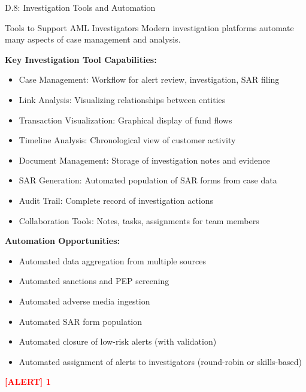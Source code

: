 \documentclass[11pt,a4paper]{beamer}
\newcommand{\redflag}[1]{\textcolor{red}{\textbf{[ALERT] 1}}}
\begin{document}
\begin{frame}{D.8: Investigation Tools and Automation}
	\begin{block}{Tools to Support AML Investigators}
		Modern investigation platforms automate many aspects of case management and analysis.
	\end{block}
	\textbf{Key Investigation Tool Capabilities:}
	\begin{itemize}
		\item Case Management: Workflow for alert review, investigation, SAR filing
		\item Link Analysis: Visualizing relationships between entities
		\item Transaction Visualization: Graphical display of fund flows
		\item Timeline Analysis: Chronological view of customer activity
		\item Document Management: Storage of investigation notes and evidence
		\item SAR Generation: Automated population of SAR forms from case data
		\item Audit Trail: Complete record of investigation actions
		\item Collaboration Tools: Notes, tasks, assignments for team members
	\end{itemize}
	\textbf{Automation Opportunities:}
	\begin{itemize}
		\item Automated data aggregation from multiple sources
		\item Automated sanctions and PEP screening
		\item Automated adverse media ingestion
		\item Automated SAR form population
		\item Automated closure of low-risk alerts (with validation)
		\item Automated assignment of alerts to investigators (round-robin or skills-based)
	\end{itemize}
	\redflag{Automation should augment, not replace, investigator judgment.}
\end{frame}
\end{document}

